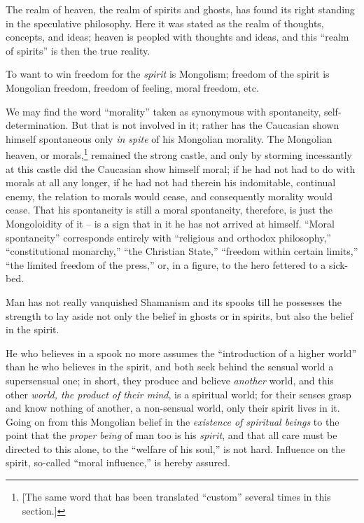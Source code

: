 \documentclass[12pt,a4paper]{book}
\begin{document}
The realm of heaven, the realm of spirits and ghosts, has found its right 
standing in the speculative philosophy. Here it was stated as the realm of 
thoughts, concepts, and ideas; heaven is peopled with thoughts and ideas, and 
this ``realm of spirits'' is then the true reality.

To want to win freedom for the \textit{spirit} is Mongolism; freedom of the 
spirit is Mongolian freedom, freedom of feeling, moral freedom, etc.

We may find the word ``morality'' taken as synonymous with spontaneity, 
self-determination. But that is not involved in it; rather has the Caucasian 
shown himself spontaneous only \textit{in spite} of his Mongolian morality. 
The Mongolian heaven, or morals,\footnote{[The same word that has been 
translated ``custom'' several times in this section.]} remained the strong 
castle, and only by storming incessantly at this castle did the Caucasian show 
himself moral; if he had not had to do with morals at all any longer, if he 
had not had therein his indomitable, continual enemy, the relation to morals 
would cease, and consequently morality would cease. That his spontaneity is 
still a moral spontaneity, therefore, is just the Mongoloidity of it -- is a 
sign that in it he has not arrived at himself. ``Moral spontaneity'' 
corresponds entirely with ``religious and orthodox philosophy,'' 
``constitutional monarchy,'' ``the Christian State,'' ``freedom within 
certain limits,'' ``the limited freedom of the press,'' or, in a figure, to 
the hero fettered to a sick-bed.

Man has not really vanquished Shamanism and its spooks till he possesses the 
strength to lay aside not only the belief in ghosts or in spirits, but also 
the belief in the spirit.

He who believes in a spook no more assumes the ``introduction of a higher 
world'' than he who believes in the spirit, and both seek behind the sensual 
world a supersensual one; in short, they produce and believe \textit{another} 
world, and this other \textit{world, the product of their mind}, is a 
spiritual world; for their senses grasp and know nothing of another, a 
non-sensual world, only their spirit lives in it. Going on from this Mongolian 
belief in the \textit{existence of spiritual beings} to the point that the 
\textit{proper being} of man too is his \textit{spirit}, and that all care 
must be directed to this alone, to the ``welfare of his soul,'' is not hard. 
Influence on the spirit, so-called ``moral influence,'' is hereby assured.
\end{document}
